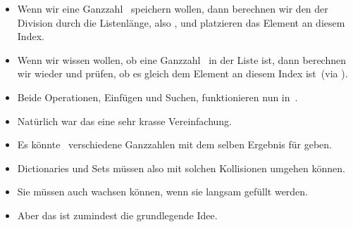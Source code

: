 \documentclass[aspectratio=169,mathserif,notheorems]{beamer}%
\begin{document}
\begin{frame}
\begin{itemize}
{}%
%
%
%
\item<18-> Wenn wir eine Ganzzahl~ speichern wollen, dann berechnen wir den  der Division durch die Listenlänge, also , und platzieren das Element an diesem Index.%
%
\item<19-> Wenn wir wissen wollen, ob eine Ganzzahl~ in der Liste ist, dann berechnen wir wieder  und prüfen, ob es gleich dem Element an diesem Index ist~(via ).%
%
\item<20-> Beide Operationen, Einfügen und Suchen, funktionieren nun in~.%
%
\item<21-> Natürlich war das eine sehr krasse Vereinfachung.%
%
\item<22-> Es könnte \DEzB\ verschiedene Ganzzahlen mit dem selben Ergebnis für  geben.%
%
\item<23-> Dictionaries und Sets müssen also mit solchen Kollisionen umgehen können.%
%
\item<24-> Sie müssen auch wachsen können, wenn sie langsam gefüllt werden.%
%
\item<25-> Aber das ist zumindest die grundlegende Idee.%
%
\end{itemize}%
\end{frame}%
%
\end{document}
